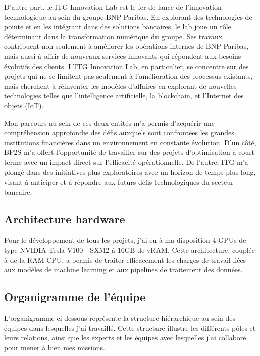 \documentclass[13pt,a4paper]{article}
\begin{document}
D'autre part, le ITG Innovation Lab est le fer de lance de l'innovation technologique au sein du groupe BNP Paribas. En explorant des technologies de pointe et en les intégrant dans des solutions bancaires, le lab joue un rôle déterminant dans la transformation numérique du groupe.
Ses travaux contribuent non seulement à améliorer les opérations internes de BNP Paribas, mais aussi à offrir de nouveaux services innovants qui répondent aux besoins évolutifs des clients. L'ITG Innovation Lab, en particulier, se concentre sur des projets qui ne se limitent pas seulement à l'amélioration des processus existants, mais cherchent à réinventer les modèles d'affaires en explorant de nouvelles technologies telles que l'intelligence artificielle, la blockchain, et l'Internet des objets (IoT).

Mon parcours au sein de ces deux entités m'a permis d'acquérir une compréhension approfondie des défis auxquels sont confrontées les grandes institutions financières dans un environnement en constante évolution. D'un côté, BP2S m'a offert l'opportunité de travailler sur des projets d'optimisation à court terme avec un impact direct sur l'efficacité opérationnelle. De l'autre, ITG m'a plongé dans des initiatives plus exploratoires avec un horizon de temps plus long, visant à anticiper et à répondre aux futurs défis technologiques du secteur bancaire.

\subsection{Architecture hardware} 
Pour le développement de tous les projets, j'ai eu à ma disposition 4 GPUs de type NVIDIA Tesla V100 - SXM2 à 16GB de vRAM. Cette architecture, couplée à de la RAM CPU, a permis de traiter efficacement les charges de travail liées aux modèles de machine learning et aux pipelines de traitement des données.

\subsection{Organigramme de l'équipe} 
L'organigramme ci-dessous représente la structure hiérarchique au sein des équipes dans lesquelles j'ai travaillé. Cette structure illustre les différents pôles et leurs relations, ainsi que les experts et les équipes avec lesquelles j'ai collaboré pour mener à bien mes missions.
\end{document}
